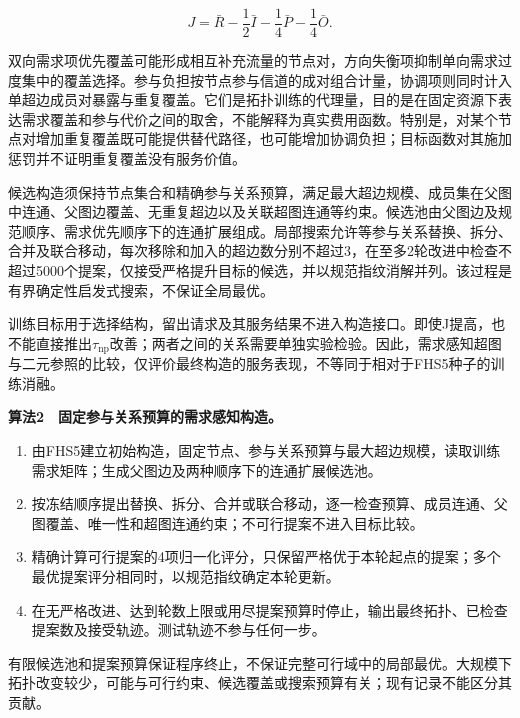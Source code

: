 \documentclass[UTF8,a4paper,twocolumn,fontset=none,zihao=5]{ctexart}
\newcommand{\algtitle}[1]{\par\Needspace{6\baselineskip}\smallskip\noindent\textbf{#1}\par\smallskip}
\begin{document}
\begin{equation}
J=\bar R-\frac{1}{2}\bar I-\frac{1}{4}\bar P-\frac{1}{4}\bar O.
\label{eq:11}\end{equation}


双向需求项优先覆盖可能形成相互补充流量的节点对，方向失衡项抑制单向需求过度集中的覆盖选择。参与负担按节点参与信道的成对组合计量，协调项则同时计入单超边成员对暴露与重复覆盖。它们是拓扑训练的代理量，目的是在固定资源下表达需求覆盖和参与代价之间的取舍，不能解释为真实费用函数。特别是，对某个节点对增加重复覆盖既可能提供替代路径，也可能增加协调负担；目标函数对其施加惩罚并不证明重复覆盖没有服务价值。


候选构造须保持节点集合和精确参与关系预算，满足最大超边规模、成员集在父图中连通、父图边覆盖、无重复超边以及关联超图连通等约束。候选池由父图边及规范顺序、需求优先顺序下的连通扩展组成。局部搜索允许等参与关系替换、拆分、合并及联合移动，每次移除和加入的超边数分别不超过3，在至多2轮改进中检查不超过5000个提案，仅接受严格提升目标的候选，并以规范指纹消解并列。该过程是有界确定性启发式搜索，不保证全局最优。


训练目标用于选择结构，留出请求及其服务结果不进入构造接口。即使J提高，也不能直接推出$\tau_{\mathrm{np}}$改善；两者之间的关系需要单独实验检验。因此，需求感知超图与二元参照的比较，仅评价最终构造的服务表现，不等同于相对于FHS5种子的训练消融。


\algtitle{算法2　固定参与关系预算的需求感知构造。}\begin{enumerate}

\item 由FHS5建立初始构造，固定节点、参与关系预算与最大超边规模，读取训练需求矩阵；生成父图边及两种顺序下的连通扩展候选池。

\item 按冻结顺序提出替换、拆分、合并或联合移动，逐一检查预算、成员连通、父图覆盖、唯一性和超图连通约束；不可行提案不进入目标比较。

\item 精确计算可行提案的4项归一化评分，只保留严格优于本轮起点的提案；多个最优提案评分相同时，以规范指纹确定本轮更新。

\item 在无严格改进、达到轮数上限或用尽提案预算时停止，输出最终拓扑、已检查提案数及接受轨迹。测试轨迹不参与任何一步。

\end{enumerate}

有限候选池和提案预算保证程序终止，不保证完整可行域中的局部最优。大规模下拓扑改变较少，可能与可行约束、候选覆盖或搜索预算有关；现有记录不能区分其贡献。
\end{document}
